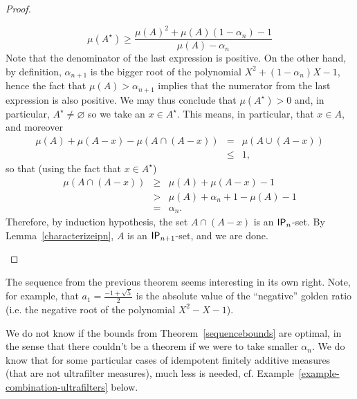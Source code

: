\documentclass{jloganal}
\theoremstyle{definition}
\newcommand{\ip}{\mathnormal{\mathsf{IP}}}
\begin{document}
\begin{proof}
\begin{enumerate}
\begin{equation*}
        \mu(A^\star)\geq\frac{\mu(A)^2+\mu(A)(1-\alpha_n)-1}{\mu(A)-\alpha_n}
    \end{equation*}
    Note that the denominator of the last expression is positive. On the other hand, by definition, $\alpha_{n+1}$ is the bigger root of the polynomial $X^2+(1-\alpha_n)X-1$, hence the fact that $\mu(A)>\alpha_{n+1}$ implies that the numerator from the last expression is also positive. We may thus conclude that $\mu(A^\star)>0$ and, in particular, $A^\star\neq\varnothing$ so we take an $x\in A^\star$. This means, in particular, that $x\in A$, and moreover
    \begin{eqnarray*}
        \mu(A)+\mu(A-x)-\mu(A\cap(A-x)) & = & \mu(A\cup(A-x)) \\
        & \leq & 1,
    \end{eqnarray*}
    so that (using the fact that $x\in A^\star$)
    \begin{eqnarray*}
        \mu(A\cap(A-x)) & \geq & \mu(A)+\mu(A-x)-1 \\
        & > & \mu(A)+\alpha_n+1-\mu(A)-1 \\
        & = &  \alpha_n.
    \end{eqnarray*}
    Therefore, by induction hypothesis, the set $A\cap(A-x)$ is an $\ip_n$-set. By Lemma~\ref{characterizeipn}, $A$ is an $\ip_{n+1}$-set, and we are done.
\end{enumerate}
\end{proof}

The sequence from the previous theorem seems interesting in its own right. Note, for example, that $a_1=\frac{-1+\sqrt{5}}{2}$ is the absolute value of the ``negative'' golden ratio (i.e. the negative root of the polynomial $X^2-X-1$).

We do not know if the bounds from Theorem~\ref{sequencebounds} are optimal, in the sense that there couldn't be a theorem if we were to take smaller $\alpha_n$. We do know that for some particular cases of idempotent finitely additive measures (that are not ultrafilter measures), much less is needed, cf. Example~\ref{example-combination-ultrafilters} below.
\end{document}
